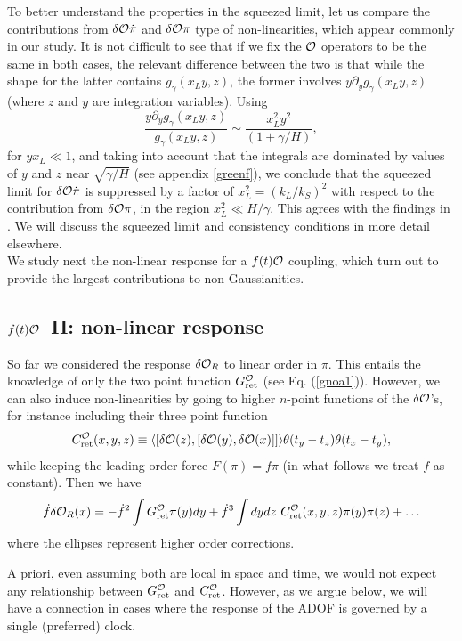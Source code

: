 \documentclass[11pt,amsmath,floats,floatfix,nofootinbib,secnumarabic, superscriptaddress, tightenlines]{revtex4}
\newcommand{\beq}{\begin{equation}}
\newcommand{\eeq}{\end{equation}}
\newcommand{\calo}{{\cal O}}
\begin{document}
{To better understand the properties in the squeezed limit, let us compare the contributions from $\delta{\calo}\dot{\pi}$ and $\delta{\calo}\pi$ type of non-linearities, which appear commonly in our study. It is not difficult to see that if we fix the $\calo$ operators to be the same in both cases, the relevant difference between the two is that while the shape for the latter contains $g_{\gamma}(x_L y, z)$, the former involves $ y \partial_{y}g_{\gamma}(x_L y, z)$ (where $z$ and $y$ are integration variables). Using  \beq
\frac{y\partial_{y}g_{\gamma}(x_L y, z)}{  g_{\gamma}(x_L y, z)}\sim \frac{x_L^2y^2}{(1+\gamma/H)},
\eeq  for $y x_L \ll 1$, and taking into account that the integrals are dominated by values of $y$ and $z$ near $\sqrt{\gamma/H}$ (see appendix \ref{greenf}), we conclude that the squeezed limit for $\delta{\calo}\dot{\pi}$ is suppressed by a factor of $x_L^2 = (k_L/k_S)^2$ with respect to the contribution from $\delta{\calo}\pi$, in the region $x^2_L \ll H/\gamma$. This agrees with the findings in \cite{creminelli11}. We will discuss the squeezed limit and consistency conditions in more detail elsewhere.\\

We study next the non-linear response for a $f(t)\calo$ coupling, which turn out to provide the largest contributions to non-Gaussianities.

\subsection{$f(t)\calo$~II: non-linear response}\label{nonlrep}

So far we considered the response $\delta\calo_R$ to linear order in $\pi$. This entails the knowledge of only the two point function $G_{\rm ret}^\calo$ (see Eq. (\ref{gnoa1})). However, we can also induce non-linearities by going to higher $n$-point functions of the $\delta\calo$'s, for instance including their three point function
\beq
C^{\calo}_{\rm ret} (x,y,z) \equiv \langle [\delta\calo(z),[\delta\calo(y),\delta\calo(x)]]\rangle \theta(t_y-t_z)\theta(t_x-t_y),
\eeq
while keeping the leading order force $F(\pi) = \dot f \pi$ (in what follows we treat $\dot f$ as constant). Then we have
\beq
\label{calo12}
\dot f \delta\calo_R(x) = -\dot f^2 \int G^\calo_{\rm ret}\pi(y) dy + \dot f^3 \int dydz~C^{\calo}_{\rm ret}(x,y,z)\pi(y)\pi(z) + \ldots
\eeq
where the ellipses represent higher order corrections.

A priori, even assuming both are local in space and time, we would not expect any relationship between $G^{\calo}_{\rm ret}$ and $C^{\calo}_{\rm ret}$.
However, as we argue below, we will have a connection in cases where the response of the ADOF is governed by a single (preferred) clock.\\

}
\end{document}
